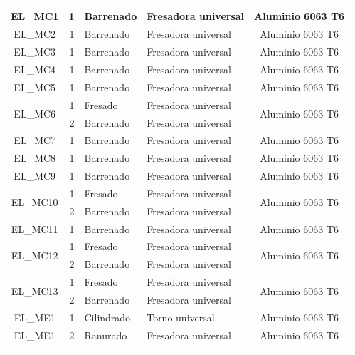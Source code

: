 \begin{longtable}{@{}|c|r|l|l|c|}
    EL\_MC1 & 1 & Barrenado & Fresadora universal & Aluminio 6063 T6 \\
    \hline
    EL\_MC2 & 1 & Barrenado & Fresadora universal & Aluminio 6063 T6 \\
    \hline
    EL\_MC3 & 1 & Barrenado & Fresadora universal & Aluminio 6063 T6 \\
    \hline
    EL\_MC4 & 1 & Barrenado & Fresadora universal & Aluminio 6063 T6 \\
    \hline
    EL\_MC5 & 1 & Barrenado & Fresadora universal & Aluminio 6063 T6 \\
    \hline
    \multirow{2}[4]{*}{EL\_MC6} & 1 & Fresado & Fresadora universal & \multirow{2}[4]{*}{Aluminio 6063 T6} \\
    \cline{2-4}      & 2 & Barrenado & Fresadora universal &  \\
    \hline
    EL\_MC7 & 1 & Barrenado & Fresadora universal & Aluminio 6063 T6 \\
    \hline
    EL\_MC8 & 1 & Barrenado & Fresadora universal & Aluminio 6063 T6 \\
    \hline
    EL\_MC9 & 1 & Barrenado & Fresadora universal & Aluminio 6063 T6 \\
    \hline
    \multirow{2}[4]{*}{EL\_MC10} & 1 & Fresado & Fresadora universal & \multirow{2}[4]{*}{Aluminio 6063 T6} \\
    \cline{2-4}      & 2 & Barrenado & Fresadora universal &  \\
    \hline
    EL\_MC11 & 1 & Barrenado & Fresadora universal & Aluminio 6063 T6 \\
    \hline
    \multirow{2}[4]{*}{EL\_MC12} & 1 & Fresado & Fresadora universal & \multirow{2}[4]{*}{Aluminio 6063 T6} \\
    \cline{2-4}      & 2 & Barrenado & Fresadora universal &  \\
    \hline
    \multirow{2}[4]{*}{EL\_MC13} & 1 & Fresado & Fresadora universal & \multirow{2}[4]{*}{Aluminio 6063 T6} \\
    \cline{2-4}      & 2 & Barrenado & Fresadora universal &  \\
    \hline
    EL\_ME1 & 1 & Cilindrado & Torno universal & Aluminio 6063 T6 \\
    \hline
    EL\_ME1 & 2 & Ranurado & Fresadora universal & Aluminio 6063 T6 \\
    \hline
	\label{tabla:RelacionPiezaMaq}
\end{longtable}

